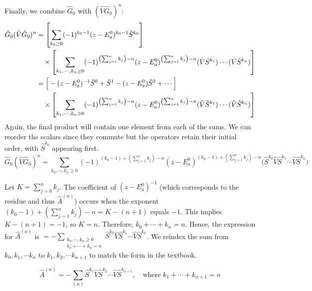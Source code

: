Finally, we combine $\hat G_0$ with $(\hat V \hat G_0)^n$:
\begin{align} \label{eq:G0_V_G0_n_expansion}
  \hat G_0(\hat V \hat G_0)^n
  &=\left[\sum_{k_0\ge 0}(-1)^{k_0-1}(z-E_a^0)^{k_0-1}\hat
  S^{k_0}\right] \notag \\
  &\quad \times \left[\sum_{k_1,\cdots,k_n\ge 0}
    (-1)^{\left(\sum_{j=1}^{n}k_j\right)-n}
    (z-E_a^0)^{\left(\sum_{j=1}^{n}k_j\right)-n}
  (\hat V \hat S^{k_1})\cdots(\hat V \hat S^{k_n})\right] \\
  &= \Big[ - (z-E_a^{0})^{-1}\hat S^{0} + \hat S^{1} - (z-E_a^{0})
  \hat S^{2} + \cdots \Big] \notag \\
  &\quad \times \left[\sum_{k_1,\cdots,k_n\ge 0}
    (-1)^{\left(\sum_{j=1}^{n}k_j\right)-n}
    (z-E_a^0)^{\left(\sum_{j=1}^{n}k_j\right)-n}
  (\hat V \hat S^{k_1})\cdots(\hat V \hat S^{k_n})\right]
\end{align}
Again, the final product will contain one element from each of the
sums. We can reorder the scalars since they commute but the operators
retain their initial order, with $\hat S ^{k_0}$ appearing first.
\begin{equation}
  \hat G_0(\hat V \hat G_0)^n =\sum_{k_0,\cdots,k_n\ge 0}
  (-1)^{(k_0-1)+\left(\sum_{j=1}^{n}k_j\right)-n}
  (z-E_a^0)^{(k_0-1)+\left(\sum_{j=1}^{n}k_j\right)-n}
  \big(\hat S^{k_0} \hat V \hat S^{k_1}\cdots \hat V \hat S^{k_n}\big)
\end{equation}

Let $K=\sum_{j=0}^{n}k_j$. The coefficient of $(z-E_a^0)^{-1}$ (which
corresponds to the residue and thus $\hat A^{(n)}$) occurs when the
exponent $(k_0-1)+\left(\sum_{j=1}^{n}k_j\right)-n = K - (n+1)$ equals $-1$.
This implies $K - (n+1) = -1$, so $K = n$.
Therefore, $k_0+\cdots+k_n=n$.
Hence, the expression for $\hat A^{(n)}$ is
$=-\sum_{\substack{k_0,\cdots,k_n\ge 0\\ k_0+\cdots+k_n=n}}
\hat S^{k_0} \hat V \hat S^{k_1}\cdots \hat V \hat S^{k_n}$. We
reindex the sum from $k_0, k_1, \cdots k_n$ to $k_1, k_2, \cdots
k_{n+1}$ to match the form in the textbook.
\begin{theorem}
  \begin{equation} \label{eq:A_n_final}
    \hat A^{(n)} = - \sum_{(n)} \hat S^{k_1} \hat V \hat
    S^{k_2}\cdots \hat V \hat
    S^{k_{n+1}},
    \quad \text{where } k_1+\cdots+k_{n+1}=n
  \end{equation}
\end{theorem}

